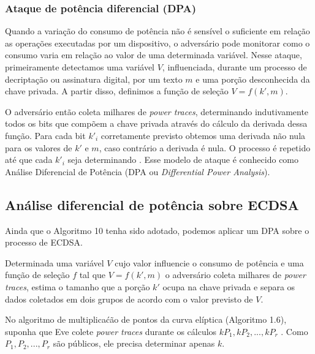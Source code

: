 \subsubsection{Ataque de potência diferencial (DPA)}
Quando a varia\c{c}\~{a}o do consumo de pot\^{e}ncia n\~{a}o \'{e} sens\'{i}vel o suficiente em rela\c{c}\~{a}o as opera\c{c}\~{o}es executadas por um dispositivo, o advers\'{a}rio pode monitorar como o consumo varia em rela\c{c}\~{a}o ao valor de uma determinada vari\'{a}vel. Nesse ataque, primeiramente detectamos uma vari\'{a}vel $V$, influenciada, durante um processo de decripta\c{c}\~{a}o ou assinatura digital, por um texto $m$ e uma por\c{c}\~{a}o desconhecida  da chave privada. A partir disso, definimos a fun\c{c}\~{a}o de sele\c{c}\~{a}o $V = f(k',m)$.

O advers\'{a}rio ent\~{a}o coleta milhares de \textit{power traces}, determinando indutivamente todos os bits que comp\~{o}em a chave privada atrav\'{e}s do c\'{a}lculo da derivada dessa fun\c{c}\~{a}o. Para cada bit $k'_{i}$ corretamente previsto obtemos uma derivada n\~{a}o nula para os valores de $k'$ e $m$, caso contr\'{a}rio a derivada \'{e} nula. O processo \'{e} repetido at\'{e} que cada $k'_{i}$ seja determinando \cite{ECCBook_HankersonVanstone2004}. Esse modelo de ataque \'{e} conhecido como An\'{a}lise Diferencial de Pot\^{e}ncia (DPA ou \textit{Differential Power Analysis}).


\subsection{An\'{a}lise diferencial de pot\^{e}ncia sobre ECDSA}
Ainda que o Algoritmo 10 tenha sido adotado, podemos aplicar um DPA sobre o processo de ECDSA. 

Determinada uma vari\'{a}vel $V$ cujo valor influencie o consumo de pot\^{e}ncia e uma fun\c{c}\~{a}o de sele\c{c}\~{a}o $f$ tal que $V = f(k', m)$ o advers\'{a}rio coleta milhares de \textit{power traces}, estima o tamanho que a por\c{c}\~{a}o $k'$ ocupa na chave privada e separa os dados coletados em dois grupos de acordo com o valor previsto de $V$.

No algoritmo de multiplica\'{c}\~{a}o de pontos da curva el\'{i}ptica (Algoritmo 1.6), suponha que Eve colete \textit{power traces} durante os c\'{a}lculos $kP_{1} , kP_{2} , ..., kP_{r}$ . Como $P_{1} , P_{2} , ..., P_{r}$ s\~{a}o p\'{u}blicos, ele precisa determinar apenas $k$.

